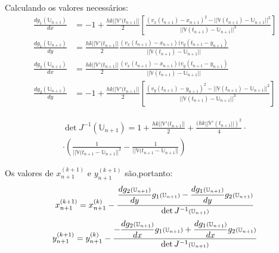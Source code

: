 \documentclass[a4paper,10pt]{article}
\begin{document}
  Calculando os valores necessários:
  \begin{align}
   \frac{dg_{1}(\mathbb{U}_{n+1})}{dx} &= -1 + \frac{hk||\mathbb{V}'(t_{n+1}||}{2} \left[\frac{(v_{x}(t_{n+1}) - x_{n+1})^{2} - ||\mathbb{V}(t_{n+1}) - \mathbb{U}_{n+1}||^{2}}{||\mathbb{V}(t_{n+1}) - \mathbb{U}_{n+1}||^{3}}\right]
   \\
   \frac{dg_{1}(\mathbb{U}_{n+1})}{dy} &= \frac{hk||\mathbb{V}'(t_{n+1}||}{2} \frac{(v_{x}(t_{n+1}) - x_{n+1}) (v_{y}(t_{n+1} - y_{n+1})}{||\mathbb{V}(t_{n+1}) - \mathbb{U}_{n+1}||}
   \\
   \frac{dg_{2}(\mathbb{U}_{n+1})}{dx} &= \frac{hk||\mathbb{V}'(t_{n+1}||}{2} \frac{(v_{x}(t_{n+1}) - x_{n+1}) (v_{y}(t_{n+1} - y_{n+1})}{||\mathbb{V}(t_{n+1}) - \mathbb{U}_{n+1}||}
   \\
   \frac{dg_{2}(\mathbb{U}_{n+1})}{dy} &= -1 + \frac{hk||\mathbb{V}'(t_{n+1}||}{2} \left[\frac{(v_{y}(t_{n+1}) - y_{n+1})^{2} - ||\mathbb{V}(t_{n+1}) - \mathbb{U}_{n+1}||^{2}}{||\mathbb{V}(t_{n+1}) - \mathbb{U}_{n+1}||^{3}}\right]
  \end{align}
  
  \begin{equation}
   \begin{split}
   \det{J^{-1}(\mathbb{U}_{n+1})} = 1 + \frac{hk||\mathbb{V}'(t_{n+1}||}{2} + \frac{(hk||\mathbb{V}'(t_{n+1}||)^{2}}{4}\cdot
   \\
   \cdot\left(\frac{1}{||\mathbb{V}(t_{n+1} - \mathbb{U}_{n+1}||^{2}} - \frac{1}{||\mathbb{V}(t_{n+1} - \mathbb{U}_{n+1}||}\right) 
   \end{split}
  \end{equation}

  Os valores de $x_{n+1}^{(k+1)}$ e $y_{n+1}^{(k+1)}$ são,portanto:
  \begin{equation}
   x_{n+1}^{(k+1)} = x_{n+1}^{(k)} - \frac{\mathlarger{\frac{dg_{2}\mathsmaller{(\mathbb{U}_{n+1})}}{dy}}g_{1}\mathsmaller{(\mathbb{U}_{n+1})} -
   \\
   \mathlarger{\frac{dg_{1}\mathsmaller{(\mathbb{U}_{n+1})}}{dy}}g_{2}\mathsmaller{(\mathbb{U}_{n+1})}
   \\
   }{\det{J^{-1}\mathsmaller{(\mathbb{U}_{n+1})}}}
  \end{equation}
  \begin{equation}
   y_{n+1}^{(k+1)} = y_{n+1}^{(k)} - \frac{\mathlarger{-\frac{dg_{2}\mathsmaller{(\mathbb{U}_{n+1})}}{dx}}g_{1}\mathsmaller{(\mathbb{U}_{n+1})} +
   \\
   \mathlarger{\frac{dg_{1}\mathsmaller{(\mathbb{U}_{n+1})}}{dx}}g_{2}\mathsmaller{(\mathbb{U}_{n+1})}
   \\
   }{\det{J^{-1}\mathsmaller{(\mathbb{U}_{n+1})}}}
   \label{eq:discret}
  \end{equation}
\end{document}
